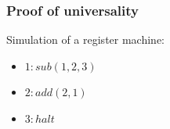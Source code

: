     \begin{frame}[t]\frametitle{Proof of universality}
      Simulation of a register machine:
      \begin{itemize}
        \item $1: sub(1,2,3)$
        \item $2: add(2,1)$
        \item $3: halt$
      \end{itemize}
    \end{frame}
    \note{}

